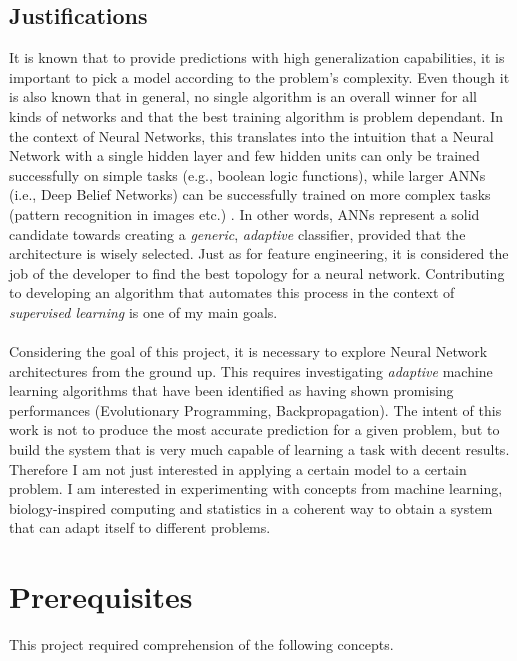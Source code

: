 \documentclass[a4paper,12pt, oneside]{memoir}
\begin{document}
\subsection{Justifications}

It is known that to provide predictions with high generalization capabilities, it is important to pick a model according to the problem's complexity. Even though it is also known\cite{yao-1999} that in general, no single algorithm is an overall winner for all kinds of networks and that the best training algorithm is problem dependant. In the context of Neural Networks, this translates into the intuition that a Neural Network with a single hidden layer and few hidden units can only be trained successfully on simple tasks (e.g., boolean logic functions), while larger ANNs (i.e., Deep Belief Networks) can be successfully trained on more complex tasks (pattern recognition in images etc.) \cite{haykin-1998}. In other words, ANNs represent a solid candidate towards creating a \textit{generic}, \textit{adaptive} classifier, provided that the architecture is wisely selected. Just as for feature engineering, it is considered the job of the developer to find the best topology for a neural network. Contributing to developing an algorithm that automates this process in the context of \textit{supervised learning} is one of my main goals.
\\
\\
Considering the goal of this project, it is necessary to explore Neural Network architectures from the ground up. This requires investigating \textit{adaptive} machine learning algorithms that have been identified as having shown promising performances (Evolutionary Programming, Backpropagation). The intent of this work is not to produce the most accurate prediction for a given problem, but to build the system that is very much capable of learning a task with decent results. Therefore I am not just interested in applying a certain model to a certain problem. I am interested in experimenting with concepts from machine learning, biology-inspired computing and statistics in a coherent way to obtain a system that can adapt itself to different problems.

\section{Prerequisites}

This project required comprehension of the following concepts.
\end{document}
